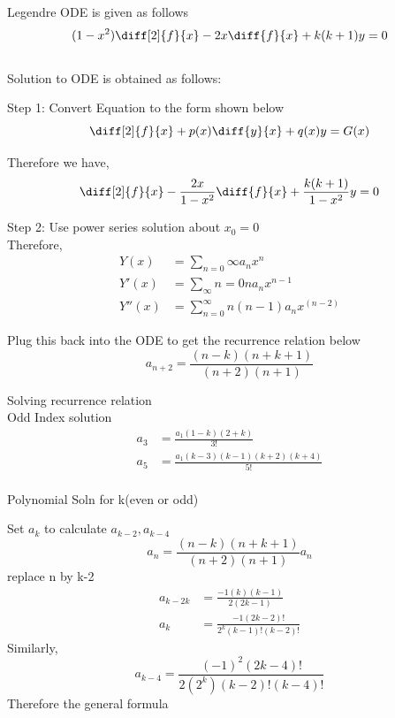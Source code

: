 \documentclass[journal]{IEEEtran}
\begin{document}
Legendre ODE is given as follows
 \begin{equation}
  (1-x^2)\diff[2]{f}{x} - 2x\diff{f}{x} + k(k+1)y = 0 \\
\end{equation} \\

Solution to ODE is obtained as follows:

Step 1: Convert Equation to the form shown below
\begin{equation}
\diff[2]{f}{x} + p(x)\diff{y}{x}  + q(x)y = G(x)
\end{equation}

Therefore we have,
\begin{equation}
     \diff[2]{f}{x} - \frac{2x}{1-x^2}\diff{f}{x} + \frac{k(k+1)}{1-x^2}y = 0
\end{equation}


Step 2: Use power series solution about $x_0 = 0$\\
Therefore, 
\begin{align}
  Y(x) &= \sum_{n=0}{\infty}a_nx^n  \\
  Y'(x) &= \sum_{\infty}{n=0}na_nx^{n-1} \\
  Y''(x) &= \sum_{n=0}^{\infty}n(n-1)a_nx^(n-2)
 \end{align}
 
 Plug this back into the ODE to get the recurrence relation
 below
 \begin{equation}
a_{n+2} = \frac{(n-k)(n+k+1)}{(n+2)(n+1)}
\end{equation}

Solving recurrence relation\\

Odd Index solution
\begin{align}
    a_3 &= \frac{a_1(1-k)(2+k)}{3!} \\
    a_5 &= \frac{a_1(k-3)(k-1)(k+2)(k+4)}{5!} \\
\end{align}

Polynomial Soln for k(even or odd)

Set $a_k$ to calculate $a_{k-2},a_{k-4}$
\begin{equation}
a_n = \frac{(n-k)(n+k+1)}{(n+2)(n+1)} a_n 
\end{equation}
replace n by k-2
\begin{align}
  a_{k-2k}&= \frac{-1(k)(k-1)}{2(2k-1)} \\
  a_k &= \frac{-1(2k-2)!}{2^k(k-1)!(k-2)!}
\end{align}
Similarly,
\begin{equation}
a_{k-4} = \frac{(-1)^2(2k-4)!}{2(2^k)(k-2)!(k-4)!}
\end{equation}
    Therefore the general formula
\end{document}
